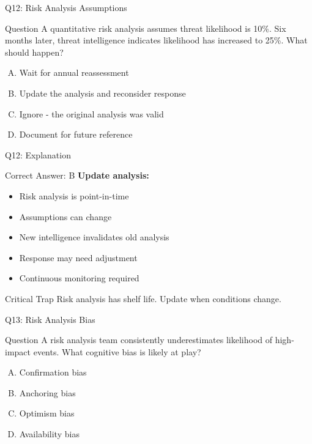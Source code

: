 \documentclass{beamer}
\begin{document}
			\begin{frame}{Q12: Risk Analysis Assumptions}
				\begin{block}{Question}
					A quantitative risk analysis assumes threat likelihood is 10\%. Six months later, threat intelligence indicates likelihood has increased to 25\%. What should happen?
				\end{block}
				\begin{enumerate}[(A)]
					\item Wait for annual reassessment
					\item Update the analysis and reconsider response
					\item Ignore - the original analysis was valid
					\item Document for future reference
				\end{enumerate}
			\end{frame}
			
			\begin{frame}{Q12: Explanation}
				\begin{block}{Correct Answer: B}
					\textbf{Update analysis:}
					\begin{itemize}
						\item Risk analysis is point-in-time
						\item Assumptions can change
						\item New intelligence invalidates old analysis
						\item Response may need adjustment
						\item Continuous monitoring required
					\end{itemize}
				\end{block}
				\begin{alertblock}{Critical Trap}
					Risk analysis has shelf life. Update when conditions change.
				\end{alertblock}
			\end{frame}
			
			\begin{frame}{Q13: Risk Analysis Bias}
				\begin{block}{Question}
					A risk analysis team consistently underestimates likelihood of high-impact events. What cognitive bias is likely at play?
				\end{block}
				\begin{enumerate}[(A)]
					\item Confirmation bias
					\item Anchoring bias
					\item Optimism bias
					\item Availability bias
				\end{enumerate}
			\end{frame}
			
\end{document}
